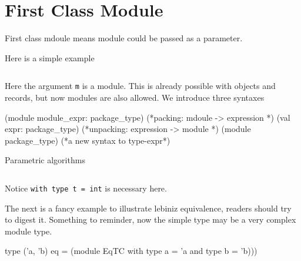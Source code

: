 \section{First Class Module}

First class mdoule  means module could be passed as a parameter.

Here is a simple example

\inputminted[fontsize=\scriptsize, ]{ocaml}{lang/code/module/intro.ml}

 
Here the argument \verb|m| is a module. This is already possible with
objects and records, but now modules are also allowed.  We introduce
three syntaxes

\begin{ocamlcode}
  (module module_expr: package_type)
  (*packing:  mdoule -> expression *)
  (val expr: package_type)
  (*unpacking: expression -> module  *)
  (module package_type)
  (*a new syntax to type-expr*)
\end{ocamlcode}


Parametric algorithms
\inputminted[fontsize=\scriptsize, fontsize=\scriptsize, ]{ocaml}{code/lang/param.ml}

Notice \verb|with type t = int| is necessary here.

The next is a fancy example to illustrate lebiniz equivalence, readers
should try to digest it. Something to reminder, now the simple type
may be a very complex module type.
\begin{ocamlcode}
type ('a, 'b) eq = (module EqTC with type a = 'a and type b = 'b)))
\end{ocamlcode}


\inputminted[fontsize=\scriptsize, fontsize=\scriptsize, ]{ocaml}{lang/code/module/leibniz.ml}


